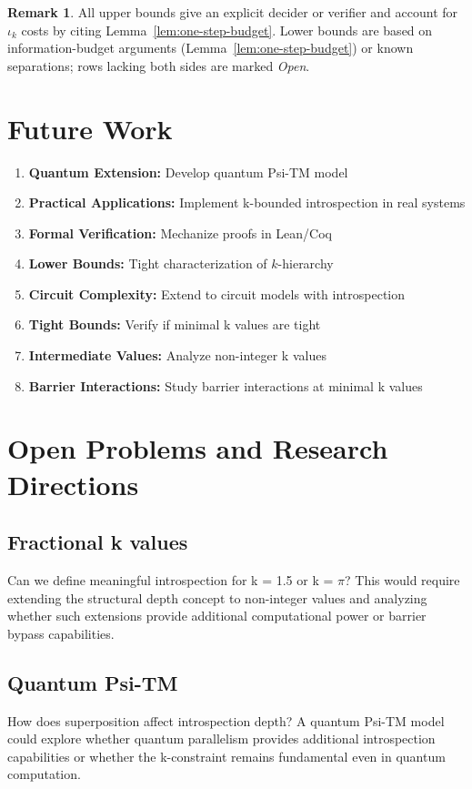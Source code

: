 \documentclass[11pt]{article}
\theoremstyle{definition}
\newtheorem{remark}[theorem]{Remark}
\begin{document}
\begin{remark}
All upper bounds give an explicit decider or verifier and account for $\iota_k$ costs by citing Lemma~\ref{lem:one-step-budget}. Lower bounds are based on information-budget arguments (Lemma~\ref{lem:one-step-budget}) or known separations; rows lacking both sides are marked \emph{Open}.
\end{remark}

\section{Future Work}

\begin{enumerate}
\item \textbf{Quantum Extension:} Develop quantum Psi-TM model
\item \textbf{Practical Applications:} Implement k-bounded introspection in real systems  
\item \textbf{Formal Verification:} Mechanize proofs in Lean/Coq
\item \textbf{Lower Bounds:} Tight characterization of $k$-hierarchy
\item \textbf{Circuit Complexity:} Extend to circuit models with introspection
\item \textbf{Tight Bounds:} Verify if minimal k values are tight
\item \textbf{Intermediate Values:} Analyze non-integer k values
\item \textbf{Barrier Interactions:} Study barrier interactions at minimal k values
\end{enumerate}

\section{Open Problems and Research Directions}

\subsection{Fractional k values}
Can we define meaningful introspection for k = 1.5 or k = $\pi$? This would require extending the structural depth concept to non-integer values and analyzing whether such extensions provide additional computational power or barrier bypass capabilities.

\subsection{Quantum Psi-TM}
How does superposition affect introspection depth? A quantum Psi-TM model could explore whether quantum parallelism provides additional introspection capabilities or whether the k-constraint remains fundamental even in quantum computation.
\end{document}
